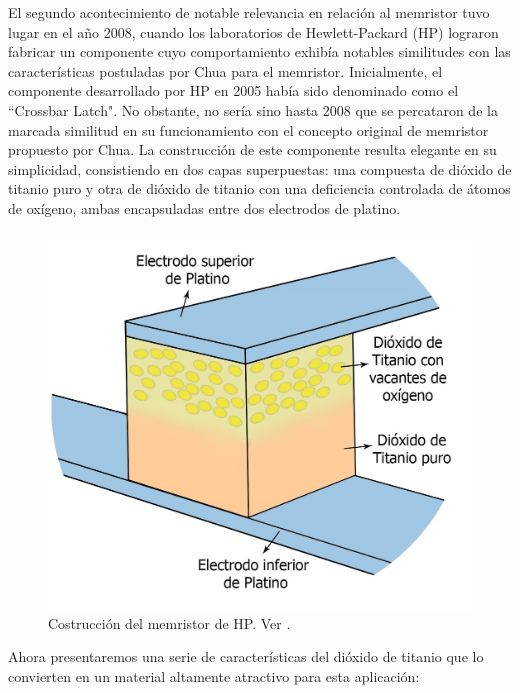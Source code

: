 \documentclass[12pt,a4paper]{report} %
\begin{document}
	\noindent El segundo acontecimiento de notable relevancia en relación al memristor tuvo lugar en el año 2008, cuando los laboratorios de Hewlett-Packard (HP) lograron fabricar un componente cuyo comportamiento exhibía notables similitudes con las características postuladas por Chua para el memristor. Inicialmente, el componente desarrollado por HP en 2005 había sido denominado como el ``Crossbar Latch". No obstante, no sería sino hasta 2008 que se percataron de la marcada similitud en su funcionamiento con el concepto original de memristor propuesto por Chua. La construcción de este componente resulta elegante en su simplicidad, consistiendo en dos capas superpuestas: una compuesta de dióxido de titanio puro y otra de dióxido de titanio con una deficiencia controlada de átomos de oxígeno, ambas encapsuladas entre dos electrodos de platino. 
	
\vspace{0.5cm}\begin{figure}[h]
		\centering
		\includegraphics[width=1\textwidth]{mem1.jpg}
		\caption{Costrucción del memristor de HP. Ver \cite{williams}.}
		\label{fig:mem1}
	\end{figure}
	
	\newpage
	
	Ahora presentaremos una serie de características del dióxido de titanio que lo convierten en un material altamente atractivo para esta aplicación:
	
	\vspace{0.5cm}
	
\end{document}
